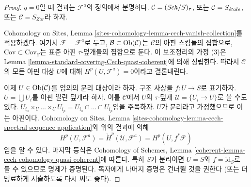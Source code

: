 \begin{proof}
$q = 0$일 때 결과는 $\mathcal{F}^a$의 정의에서 분명하다.
$\mathcal{C} = (\mathit{Sch}/S)_\tau$, 또는 $\mathcal{C} = S_{\acute{e}tale}$,
또는 $\mathcal{C} = S_{Zar}$라 하자.

\medskip\noindent
Cohomology on Sites, Lemma
\ref{sites-cohomology-lemma-cech-vanish-collection}를 적용하겠다.
여기서 $\mathcal{F} = \mathcal{F}^a$로 두고,
$\mathcal{B} \subset \mathop{\mathrm{Ob}}\nolimits(\mathcal{C})$는 $\mathcal{C}$의 아핀 스킴들의
집합으로, $\text{Cov} \subset \text{Cov}_\mathcal{C}$는 표준 아핀
$\tau$-덮개들의 집합으로 둔다. 이 보조정리의 가정 (3)은 Lemma
\ref{lemma-standard-covering-Cech-quasi-coherent}에 의해 성립한다.
따라서 $\mathcal{C}$의 모든 아핀 대상 $U$에 대해
$H^p(U, \mathcal{F}^a) = 0$이라고 결론내린다.

\medskip\noindent
이제 $U \in \mathop{\mathrm{Ob}}\nolimits(\mathcal{C})$를 임의의 분리 대상이라 하자.
구조 사상을 $f : U \to S$로 표기하자.
$U = \bigcup U_i$를 아핀 열린 덮개라 하자. 이를 $\mathcal{C}$에서
$U$의 $\tau$-덮개 $\mathcal{U} = \{U_i \to U\}$로 볼 수도 있다.
$U_{i_0} \times_U \ldots \times_U U_{i_p} =
U_{i_0} \cap \ldots \cap U_{i_p}$임을 주목하자. $U$가 분리라고
가정했으므로 이는 아핀이다. Cohomology on Sites, Lemma
\ref{sites-cohomology-lemma-cech-spectral-sequence-application}와
위의 결과에 의해
$$
H^p(U, \mathcal{F}^a) = \check{H}^p(\mathcal{U}, \mathcal{F}^a)
= H^p(U, f^*\mathcal{F})
$$
임을 알 수 있다. 마지막 등식은 Cohomology of Schemes, Lemma
\ref{coherent-lemma-cech-cohomology-quasi-coherent}에 따른다.
특히 $S$가 분리이면 $U = S$와 $f = \text{id}_S$로 둘 수 있으므로
명제가 증명된다. 독자에게 나머지 증명은 건너뛸 것을 권한다
(또는 더 명료하게 서술하도록 다시 써도 좋다).


\end{proof}
